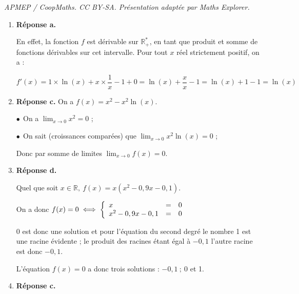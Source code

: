 \documentclass[10pt]{article}
\providecommand{\R}{\mathbb{R}}
\begin{document}
\noindent\textit{APMEP / CoopMaths. CC BY-SA. Présentation adaptée par Maths Explorer.}\par\medskip
\medskip

\begin{enumerate}
\item \textbf{Réponse a.}

En effet, la fonction $f$ est dérivable sur $\R_{+}^{*}$, en tant que produit et somme de fonctions dérivables sur cet intervalle. Pour tout $x$ réel strictement positif, on a :

$f'(x)= 1 \times \ln(x) + x \times \dfrac{1}{x} - 1 + 0 = \ln(x) + \dfrac{x}{x} - 1 = \ln(x) +1-1 = \ln (x)$
\item \textbf{Réponse c.}
On a $f(x) = x^2 - x^2\ln (x)$.

$\bullet~~$On a $\displaystyle\lim_{x \to 0} x^2 = 0$ ;

$\bullet~~$On sait (croissances comparées) que  $\displaystyle\lim_{x \to 0} x^2 \ln (x) = 0$ ;

Donc par somme de limites $\displaystyle\lim_{x \to 0}f(x) = 0$.





\item \textbf{Réponse d.}

Quel que soit $x \in \R,\: f(x) = x\left(x^2 - 0,9x - 0,1\right)$.

On a donc $f(x) = 0 \iff \left\{\begin{array}{l c l}
x&=&0\\
x^2 - 0,9x - 0,1&=&0
\end{array}\right.$

$0$ est donc une solution et pour l'équation du second degré le nombre 1 est une racine évidente ; le produit des racines étant égal à $-0,1$ l'autre racine est donc $- 0,1$.

L'équation $f(x) = 0$  a donc trois solutions : $-0,1 \:;\ 0$ et 1.

























			\item \textbf{Réponse c.}


\end{enumerate}
\end{document}
